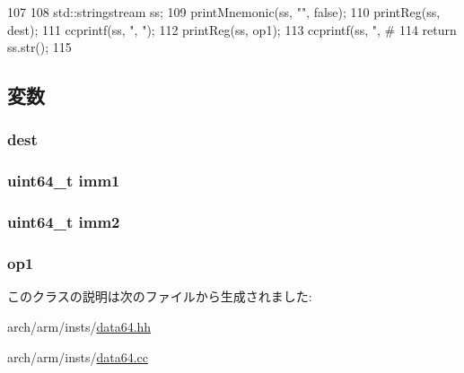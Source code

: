\begin{DoxyCode}
107 {
108     std::stringstream ss;
109     printMnemonic(ss, "", false);
110     printReg(ss, dest);
111     ccprintf(ss, ", ");
112     printReg(ss, op1);
113     ccprintf(ss, ", #%
114     return ss.str();
115 }
\end{DoxyCode}


\subsection{変数}
\hypertarget{classArmISA_1_1DataX1Reg2ImmOp_aec72e8e45bdc87abeeeb75d2a8a9a716}{
\subsubsection[{dest}]{ {\bf dest}}}
\label{classArmISA_1_1DataX1Reg2ImmOp_aec72e8e45bdc87abeeeb75d2a8a9a716}
\hypertarget{classArmISA_1_1DataX1Reg2ImmOp_a846a1153344f66cc5d7c5af6fc071bb4}{
\subsubsection[{imm1}]{\setlength{\rightskip}{0pt plus 5cm}uint64\_\-t {\bf imm1}}}
\label{classArmISA_1_1DataX1Reg2ImmOp_a846a1153344f66cc5d7c5af6fc071bb4}
\hypertarget{classArmISA_1_1DataX1Reg2ImmOp_a4b3bca3d7461f9d143e9bcd456390a27}{
\subsubsection[{imm2}]{\setlength{\rightskip}{0pt plus 5cm}uint64\_\-t {\bf imm2}}}
\label{classArmISA_1_1DataX1Reg2ImmOp_a4b3bca3d7461f9d143e9bcd456390a27}
\hypertarget{classArmISA_1_1DataX1Reg2ImmOp_a4c465c43ad568f8bcf8ae71480e9cfea}{
\subsubsection[{op1}]{ {\bf op1}}}
\label{classArmISA_1_1DataX1Reg2ImmOp_a4c465c43ad568f8bcf8ae71480e9cfea}


このクラスの説明は次のファイルから生成されました:\begin{DoxyCompactItemize}
\item 
arch/arm/insts/\hyperlink{data64_8hh}{data64.hh}\item 
arch/arm/insts/\hyperlink{data64_8cc}{data64.cc}\end{DoxyCompactItemize}
